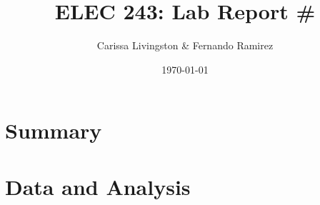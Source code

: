 \documentclass[12pt]{amsart}
\title{ELEC  243: Lab Report \# \reportnumber}
\author{Carissa Livingston \& Fernando Ramirez}
\date{\today}
\begin{document}
	\maketitle
	\section{Summary}
	\section{Data and Analysis}


	\section{}
	
\end{document}
